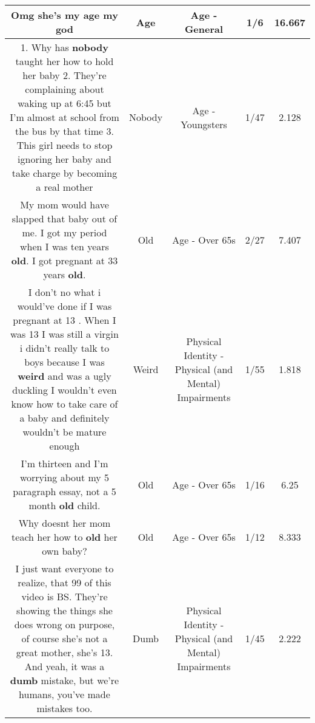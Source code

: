 \documentclass[11pt]{article}
\newlength\mylength
\begin{document}
\begin{center}
\begin{longtable}{|C{.65\mylength}|C{.30\mylength}|C{.12\mylength}|C{.12\mylength}|C{.12\mylength}|}
  \small Omg she's my \textbf{age} my god\normalsize   & Age & Age - General & 1/6 & 16.667 \\  \hline
  \small 1. Why has \textbf{nobody} taught her how to hold her baby 2. They're complaining about waking up at 6:45 but I'm almost at school from the bus by that time 3. This girl needs to stop ignoring her baby and take charge by becoming a real mother\normalsize   & Nobody & Age - Youngsters & 1/47 & 2.128 \\  \hline
  \small My mom would have slapped that baby out of me. I got my period when I was ten years \textbf{old}. I got pregnant at 33 years \textbf{old}.\normalsize   & Old & Age - Over 65s & 2/27 & 7.407 \\  \hline
  \small I don't no what i would've done if I was pregnant at 13 . When I was 13 I was still a virgin i didn't really talk to boys because I was \textbf{weird} and was a ugly duckling I wouldn't even know how to take care of a baby and definitely wouldn't be mature enough\normalsize   & Weird & Physical Identity - Physical (and Mental) Impairments & 1/55 & 1.818 \\  \hline
  \small I'm thirteen and I'm worrying about my 5 paragraph essay, not a 5 month \textbf{old} child.\normalsize   & Old & Age - Over 65s & 1/16 & 6.25 \\  \hline
  \small Why doesnt her mom teach her how to \textbf{old} her own baby?\normalsize   & Old & Age - Over 65s & 1/12 & 8.333 \\  \hline
  \small I just want everyone to realize, that 99 of this video is BS. They're showing the things she does wrong on purpose, of course she's not a great mother, she's 13. And yeah, it was a \textbf{dumb} mistake, but we're humans, you've made mistakes too.\normalsize   & Dumb & Physical Identity - Physical (and Mental) Impairments & 1/45 & 2.222 \\  \hline

\end{longtable}
\end{center}
\end{document}
